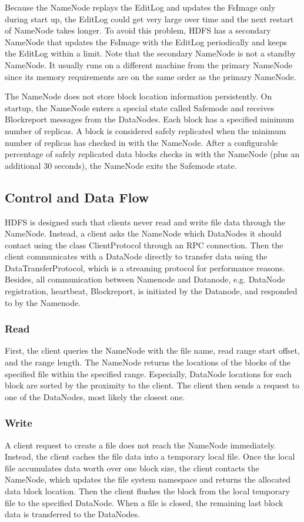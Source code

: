 \documentclass[11pt]{book}
\begin{document}
Because the NameNode replays the EditLog and updates the FsImage only during start up, the EditLog could get very large over time and the next restart of NameNode takes longer. To avoid this problem, HDFS has a secondary NameNode that updates the FsImage with the EditLog periodically and keeps the EditLog within a limit. Note that the secondary NameNode is not a standby NameNode. It usually runs on a different machine from the primary NameNode since its memory requirements are on the same order as the primary NameNode.

The NameNode does not store block location information persistently. On startup, the NameNode enters a special state called Safemode and receives Blockreport messages from the DataNodes. Each block has a specified minimum number of replicas. A block is considered safely replicated when the minimum number of replicas has checked in with the NameNode. After a configurable percentage of safely replicated data blocks checks in with the NameNode (plus an additional 30 seconds), the NameNode exits the Safemode state.

\subsection{Control and Data Flow}
HDFS is designed such that clients never read and write file data through the NameNode. Instead, a client asks the NameNode which DataNodes it should contact using the class ClientProtocol through an RPC connection. Then the client communicates with a DataNode directly to transfer data using the DataTransferProtocol, which is a streaming protocol for performance reasons. Besides, all communication between Namenode and Datanode, e.g. DataNode registration, heartbeat, Blockreport, is initiated by the Datanode, and responded to by the Namenode.

\subsubsection{Read}
First, the client queries the NameNode with the file name, read range start offset, and the range length. The NameNode returns the locations of the blocks of the specified file within the specified range. Especially, DataNode locations for each block are sorted by the proximity to the client. The client then sends a request to one of the DataNodes, most likely the closest one.

\subsubsection{Write}
A client request to create a file does not reach the NameNode immediately. Instead, the client caches the file data into a temporary local file. Once the local file accumulates data worth over one block size, the client contacts the NameNode, which updates the file system namespace and returns the allocated data block location. Then the client flushes the block from the local temporary file to the specified DataNode. When a file is closed, the remaining last block data is transferred to the DataNodes.
\end{document}
